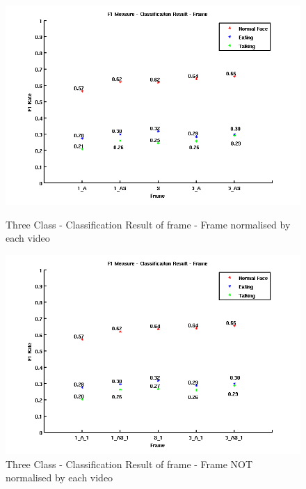 \begin{figure}[ht]
\centering
\begin{minipage}{.5\textwidth}
  \centering
  \captionsetup{justification=centering, margin=1cm}
  \includegraphics[width=\linewidth]{imgs/Result_F1_Frame.png}
  \caption{Three Class - Classification Result of frame - Frame normalised by each video}
  \label{fig:RFF}
\end{minipage}%
\begin{minipage}{.5\textwidth}
  \centering
  \captionsetup{justification=centering, margin=1cm}
  \includegraphics[width=\linewidth]{imgs/Result_F1_Frame_1.png}
  \caption{Three Class - Classification Result of frame - Frame NOT normalised by each video}
  \label{fig:RFF1}
\end{minipage}
\end{figure}
\newline
